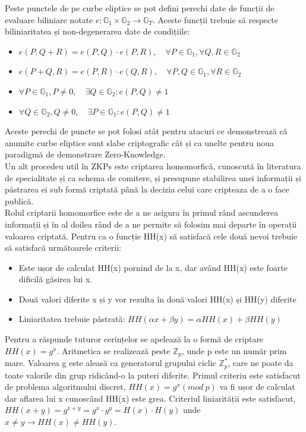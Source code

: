 Peste punctele de pe curbe eliptice se pot defini perechi date de funcții de evaluare biliniare notate $e: \mathbb{G}_1 \times \mathbb{G}_2 \rightarrow \mathbb{G}_T$. Aceste funcții trebuie să respecte biliniaritatea și non-degenerarea date de condițiile:
\begin{itemize}
    \item $e(P,Q+R) = e(P,Q) \cdot e(P,R), \quad \forall P \in \mathbb{G}_1, \forall Q,R \in \mathbb{G}_2$
    \item $e(P+Q,R) = e(P,R) \cdot e(Q,R), \quad \forall P,Q \in \mathbb{G}_1, \forall R \in \mathbb{G}_2$
    \item $\forall P \in \mathbb{G}_1, P \neq 0,\quad \exists Q \in \mathbb{G}_2: e(P,Q) \neq 1$
    \item $\forall Q \in \mathbb{G}_2, Q \neq 0,\quad \exists P \in \mathbb{G}_1: e(P,Q) \neq 1$
\end{itemize}

\clearpage

Aceste perechi de puncte se pot folosi atât pentru atacuri ce demonstrează că anumite curbe eliptice sunt slabe criptografic cât și ca unelte pentru noua paradigmă de demonstrare Zero-Knowledge.\\

Un alt procedeu util în ZKPs este criptarea homomorfică, cunoscută în literatura de specialitate și ca schema de comitere, și presupune stabilirea unei informații și păstrarea ei sub formă criptată până la decizia celui care cripteaza de a o face publică.\\

Rolul criptarii homomorfice este de a ne asigura în primul rând ascunderea informații și în al doilea rând de a ne permite să folosim mai departe în operații valoarea criptată. Pentru ca o funcție HH(x) să satisfacă cele două nevoi trebuie să satisfacă următoarele criterii:
\begin{itemize}
    \item Este ușor de calculat HH(x) pornind de la x, dar având HH(x) este foarte dificilă găsirea lui x.
    \item Două valori diferite x și y vor rezulta în două valori HH(x) și HH(y) diferite
    \item Liniaritatea trebuie păstrată: $HH(\alpha x + \beta y) = \alpha HH(x) + \beta HH(y)$
\end{itemize}

Pentru a răspunde tuturor cerințelor se apelează la o formă de criptare $HH(x) = g^x$. Aritmetica se realizează peste $\mathbb{Z}_p$, unde p este un număr prim mare. Valoarea g este aleasă ca generatorul grupului ciclic $\mathbb{Z}^*_p$, care ne poate da toate valorile din grup ridicând-o la puteri diferite.
Primul criteriu este satisfacut de problema algoritmului discret, $HH(x) = g^x (mod \ p)$ va fi ușor de calculat dar aflarea lui x cunoscând HH(x) este grea. Criteriul liniarității este satisfacut, $HH(x + y) = g^{x+y} = g^x \cdot g^y = H(x) \cdot H(y)$ unde $x \ne y \rightarrow HH(x) \ne HH(y)$.\\

